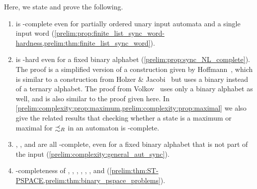 
Here, we state and prove the following.

\begin{enumerate}
	
\item \DFASW is \LOGSPACE-complete even for partially ordered unary input automata
and a single input word (\cref{prelim:prop:finite_list_sync_word-hardness,prelim:thm:finite_list_sync_word}).
	
\item \DFAST is \NL-hard even for a fixed binary alphabet (\cref{prelim:prop:sync_NL_complete}).
 The proof is a simplified version of a 
 construction given by Hoffmann~\cite[Thm.~5]{DBLP:journals/tcs/Hoffmann21},
 which is similar to a construction
 from Holzer \& Jacobi~\cite[Lem.~14]{HolzerJ18}
 but uses a binary instead of a ternary alphabet.
 The proof
 from Volkov~\cite[Prop.~2.2, due to Sreejith]{Volkov22}
 uses only a binary alphabet as well,
 and is also similar to the proof given here.
 In \cref{prelim:complexity:prop:maximum,prelim:complexity:prop:maximal} 
 we also give the related results
 that checking whether a state is a maximum or maximal for $\precsim_R$
 in an automaton is \NL-complete.
 
\item \DFAS, \DFAST, and \DFASS 
 are all \NL-complete, even for a fixed binary alphabet that is not part of the input (\cref{prelim:complexity:general_aut_sync}).
 
\item \PSPACE-completeness of \SFS, \SIS, \DFAINT, \DST, \ST, \REACH, and \REACHF (\cref{prelim:thm:ST-PSPACE,prelim:thm:binary_pspace_problems}).
\end{enumerate}

